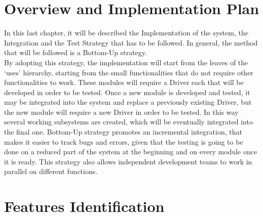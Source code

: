 \section{Overview and Implementation Plan}

In this last chapter, it will be described the Implementation of the system, the Integration and the Test Strategy that has to be followed. In general, the method that will be followed is a Bottom-Up strategy.
\\By adopting this strategy, the implementation will start from the leaves of the ‘uses’ hierarchy, starting from the small functionalities that do not require other functionalities to work. These modules will require a Driver each that will be developed in order to be tested. Once a new module is developed and tested, it may be integrated into the system and replace a previously existing Driver, but the new module will require a new Driver in order to be tested. In this way several working subsystems are created, which will be eventually integrated into the final one. Bottom-Up strategy promotes an incremental integration, that makes it easier to track bugs and errors, given that the testing is going to be done on a reduced part of the system at the beginning and on every module once it is ready. This strategy also allows independent development teams to work in parallel on different functions.


\section{Features Identification}



